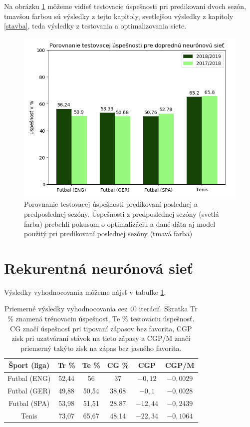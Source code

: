 Na obrázku \ref{fig9} môžeme vidieť testovacie úspešnosti pri pre\-dikovaní dvoch sezón, tmavšou farbou sú výsledky z tejto kapitoly, svetlejšou výsledky z kapitoly \ref{stavba}, teda výsledky z testovania a optimalizovania siete.
\begin{figure}[h!]
    \includegraphics[width=\textwidth]{../img/ffnn_bars.png} 
    \caption{Porovnanie testovacej úspešnosti predikovaní poslednej a predposlednej sezóny. Úspešnosti z predposlednej sezóny (svetlá farba) prebehli pokusom o optimalizáciu a dané dáta aj model použitý pri predikovaní poslednej sezóny (tmavá farba)}
    \label{fig9} 
\end{figure}

\section{Rekurentná neurónová sieť}

Výsledky vyhodnocovania môžeme nájsť v tabuľke \ref{res_rnn}.

\begin{table}[h!]
\begin{center}
\begin{tabular}{ c|c|c|c|c|c| } 
 
 Šport (liga) & Tr \% &  Te \% & CG \% & CGP & CGP/M \\ 
 \hline 
 Futbal (ENG) & 52,44 & 56 & 37 & $-0,12$ & $-0,0029$\\ 
 Futbal (GER) & 49,88 & 50,54 & 38,68 & $-0,1$ & $-0,0028$ \\ 
 Futbal (SPA) & 53,98 & 51,51 & 28,87 & $-12,44$ & $-0,2439$\\
 Tenis & 73,07 & 65,67 & 48,14 & $-22,34$ & $-0,1064$ \\ 
 \hline
\end{tabular}
\caption{Priemerné výsledky vyhodnocovania cez 40 iterácií. Skratka Tr \% znamená trénovaciu úspešnosť, Te \% testovaciu úspešnosť. CG značí úspešnosť pri tipovaní zápasov bez favorita, CGP zisk pri uzatváraní stávok na tieto zápasy a CGP/M značí priemerný takýto zisk na zápas bez jasného favorita.}
\label{res_rnn}
\end{center}
\end{table}

